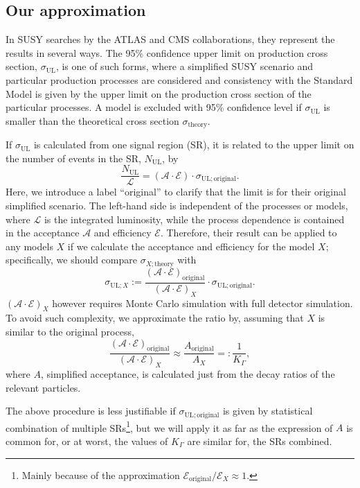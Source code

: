 \documentclass[a4paper,10pt,captions=tableheading,DIV=14]{scrartcl}
\numberwithin{equation}{section}
\newcommand\w[1]{_{\mathrm{#1}}}
\begin{document}
\subsection{Our approximation}

In SUSY searches by the ATLAS and CMS collaborations, they represent the results in several ways.
The 95\% confidence upper limit on production cross section, $\sigma\w{UL}$, is one of such forms, where a simplified SUSY scenario and particular production processes are considered and consistency with the Standard Model is given by the upper limit on the production cross section of the particular processes.
A model is excluded with 95\% confidence level if $\sigma\w{UL}$ is smaller than the theoretical cross section $\sigma\w{theory}$.

If $\sigma\w{UL}$ is calculated from one signal region (SR), it is related to the upper limit on the number of events in the SR, $N\w{UL}$, by
\begin{equation}
 \frac{N\w{UL}}{\mathcal L} = (\mathcal A\cdot \mathcal E)\cdot\sigma\w{UL;original}.
\label{eq:NUL}
\end{equation}
Here, we introduce a label ``original'' to clarify that the limit is for their original simplified scenario.
The left-hand side is independent of the processes or models, where $\mathcal L$ is the integrated luminosity, while the process dependence is contained in the acceptance $\mathcal A$ and efficiency $\mathcal E$.
Therefore, their result can be applied to any models $X$ if we calculate the acceptance and efficiency for the model $X$; specifically, we should compare $\sigma_{X;\text{theory}}$ with
\begin{equation}
 \sigma_{\text{UL};X} :=
 \frac{(\mathcal A\cdot \mathcal E)\w{original}}{(\mathcal A\cdot\mathcal E)_X}\cdot\sigma\w{UL;original}.
\label{eq:ULtranslation}
\end{equation}
$(\mathcal A\cdot\mathcal E)_{X}$ however requires Monte Carlo simulation with full detector simulation.
To avoid such complexity, we approximate the ratio by, assuming that $X$ is similar to the original process,
\begin{equation}
 \frac{(\mathcal A\cdot \mathcal E)\w{original}}{(\mathcal A\cdot\mathcal E)_X}
\approx
 \frac{A\w{original}}{A_X}=:\frac{1}{K_\Gamma},
\label{eq:ULapprox}
\end{equation}
where $A$, simplified acceptance, is calculated just from the decay ratios of the relevant particles.

The above procedure is less justifiable if $\sigma\w{UL;original}$ is given by statistical combination of multiple SRs\footnote{Mainly because of the approximation $\mathcal E\w{original}/\mathcal E_X\approx 1$.},
but we will apply it as far as the expression of $A$ is common for, or at worst, the values of $K_\Gamma$ are similar for, the SRs combined.
\end{document}
